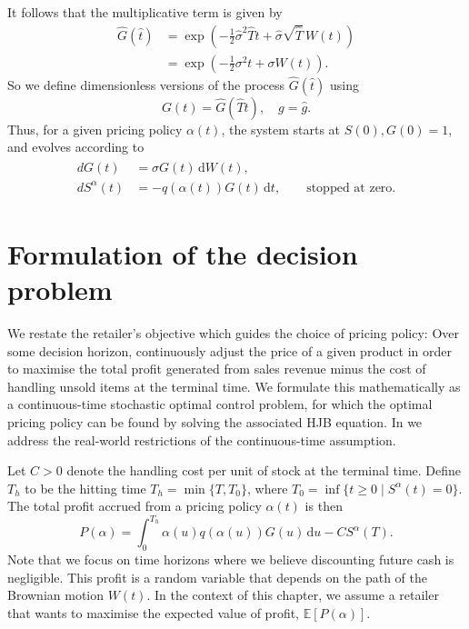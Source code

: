 \documentclass[main.tex]{subfiles}
\begin{document}
It follows that the multiplicative term is given by
\begin{align}
  \hat{G}(\hat{t})
  &=\exp\left(
    -{\textstyle\frac{1}{2}}\hat{\sigma}^2\hat{T}t +\hat{\sigma} \sqrt{\hat{T}}\,W(t)\right)\\
  &=\exp\left(-{\textstyle\frac{1}{2}}\sigma^2t +\sigma W(t)\right).
\end{align}
So we define dimensionless versions of the process $\hat{G}(\hat{t})$
using
\begin{equation}
  G(t)=\hat{G}(\hat{T}t),\quad g=\hat{g}.
\end{equation}
Thus, for a given pricing policy $\alpha(t)$, the
system starts at $S(0),G(0)=1$, and evolves according to
\begin{align}
  \begin{split}\label{eq:gbm_sde_nondim}
    d G(t)&=\sigma G(t)\,\mathrm{d}W(t),\\
    dS^{\alpha}(t)&=-q(\alpha(t))G(t)\,\mathrm{d}t,
    \qquad\text{stopped at zero}.
  \end{split}
\end{align}



\section{Formulation of the decision
  problem}\label{sec:decision_formulation}
We restate the retailer's objective which
guides the choice of pricing policy: Over some decision horizon, continuously
adjust the price of a given product in order to maximise
the total profit generated from sales revenue minus the cost of handling
unsold items at the terminal time. We formulate this mathematically as
a continuous-time stochastic optimal control problem, for which the optimal pricing
policy can be found by solving the associated HJB equation.
In  we address the real-world restrictions of
the continuous-time assumption.

Let $C>0$ denote the handling cost per unit of stock at the terminal
time. Define $T_h$ to be the hitting time $T_h=\min \{T, T_0\}$, where
$T_0=\inf\{t\geq 0\mid S^\alpha(t)=0\}$.
The total profit accrued from a pricing policy $\alpha(t)$ is then
\begin{equation}\label{eq:profit_expression}
  P(\alpha) = \int_0^{T_h}\alpha(u)q(\alpha(u))G(u)\,\mathrm{d}u - CS^\alpha(T).
\end{equation}
Note that we focus on time horizons where we believe discounting
future cash is negligible.
This profit is a random variable that depends on the path of the
Brownian motion $W(t)$. %
In the context of this chapter, we assume a retailer that
wants to maximise the expected value of profit, $\mathbb
E[P(\alpha)]$.
\end{document}
